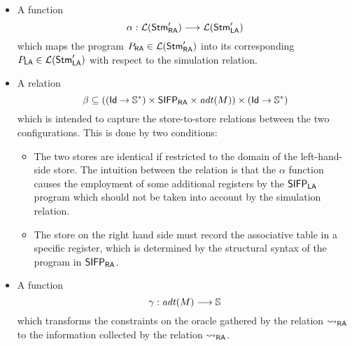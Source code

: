 \begin{itemize}
  \item A function
  $$
  \alpha: {\mathcal L ({\mathsf{Stm}_{\mathsf{RA}}'})}
  \longrightarrow
  {\mathcal L ({\mathsf{Stm}_{\mathsf{LA}}'})}
  $$
  which maps the program $P_{\mathsf{RA}} \in {\mathcal L ({\mathsf{Stm}_{\mathsf{RA}}'})}$ into its
  corresponding $P_{\mathsf{LA}} \in {\mathcal L ({\mathsf{Stm}_{\mathsf{LA}}'})}$ with respect to
  the simulation relation.

  \item A relation
  $$
  \beta \subseteq \left(\left(\mathsf{Id}\to{\mathbb{S}^*}\right) \times \mathsf{SIFP_{{\mathsf{RA}}}} \times \mathit{adt}(M)\right)
  \times
  \left(\mathsf{Id}\to{\mathbb{S}^*}\right)
  $$
  which is intended to capture the store-to-store relations
  between the two configurations.
  This is done by two conditions:
  \begin{itemize}
    \item The two stores are identical if restricted to the
    domain of the left-hand-side store. The intuition between the relation is that
    the $\alpha$ function causes the employment of some additional registers by the
    $\mathsf{SIFP_{{\mathsf{LA}}}}$ program which should not be taken into account by the simulation relation.
    \item The store on the right hand side must record the associative table in a specific
    register, which is determined by the structural syntax of the program in $\mathsf{SIFP_{{\mathsf{RA}}}}$.
  \end{itemize}

  \item A function
  $$
  \gamma:
  \mathit{adt}(M)
  \longrightarrow
  \mathbb{S}
  $$
  which transforms the constraints on the oracle gathered by the relation
  ${\leadsto_{\mathsf{RA}}}$ to the information collected by the relation ${\leadsto_{\mathsf{RA}}}$.
\end{itemize}



